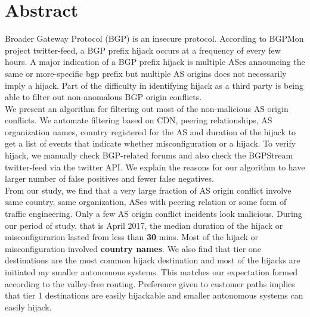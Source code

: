  \section{Abstract}\label{sec:abstract}
Broader Gateway Protocol (BGP) is an insecure protocol. According to BGPMon project twitter-feed, a BGP prefix hijack occurs at a frequency of every few hours. A major indication of a BGP prefix hijack is multiple ASes announcing the same or more-specific bgp prefix but multiple AS origins does not necessarily imply a hijack. Part of the difficulty in identifying hijack as a third party is being able to filter out non-anomalous BGP origin conflicts.\\
We present an algorithm for filtering out most of the non-malicious AS origin conflicts. We automate filtering based on CDN, peering relationships, AS organization names, country registered for the AS and duration of the hijack to get a list of events that indicate whether misconfiguration or a hijack. To verify hijack, we manually check BGP-related forums and also check the BGPStream twitter-feed via the twitter API. We explain the reasons for our algorithm to have larger number of false positives and fewer false negatives. \\
From our study, we find that a very large fraction of AS origin conflict involve same country, same organization, ASes with peering relation or some form of traffic engineering. Only a few AS origin conflict incidents look malicious. During our period of study, that is April 2017, the median duration of the hijack or misconfigurarion lasted from less than \textbf{30 }mins. Most of the hijack or misconfiguration involved  \textbf{country names}. We also find that tier one destinations are the most common hijack destination and most of the hijacks are initiated my smaller autonomous systems. This matches our expectation formed according to the valley-free routing. Preference given to customer paths implies that tier 1 destinations are easily hijackable and smaller autonomous systems can easily hijack. 